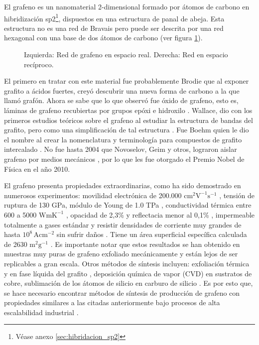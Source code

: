 
El grafeno es un nanomaterial 2-dimensional formado por átomos de carbono en hibridización sp2\footnote{Véase anexo  \ref{sec:hibridacion_sp2}}, dispuestos en una estructura de panal de abeja. Esta estructura no es una red de Bravais pero puede ser descrita por una red hexagonal con una base de dos átomos de carbono (ver figura \ref{fig_graphene_lattice}). 

\begin{figure}
	\centering
	\caption[Estructura cristalina del grafeno]{Izquierda: Red de grafeno en espacio real. Derecha: Red en espacio recíproco.}
	\label{fig_graphene_lattice}
\end{figure}

El primero en tratar con este material fue probablemente Brodie \citep{Brodie1859} que al exponer grafito a ácidos fuertes, creyó descubrir una nueva forma de carbono a la que llamó grafón. Ahora se sabe que lo que observó fue óxido de grafeno, esto es, láminas de grafeno recubiertas por grupos epóxi e hidroxilo \citep{Geim2012}. Wallace, dio con los primeros estudios teóricos sobre el grafeno al estudiar la estructura de bandas del grafito, pero como una simplificación de tal estructura \citep{Wallace1947}. Fue Boehm quien le dio el nombre al crear la nomenclatura y terminología para compuestos de grafito intercalado \citep{Boehm1986}. No fue hasta 2004 que Novoselov, Geim y otros, lograron aislar grafeno por medios mecánicos \citep{Novoselov2004}, por lo que les fue otorgado el Premio Nobel de Física en el año 2010.

El grafeno presenta propiedades extraordinarias, como ha sido demostrado en numerosos experimentos: movilidad electrónica de 200.000 $\mathrm{cm^2 V^{-1} s^{-1} }$ \citep{Bolotin2008}, tensión de ruptura de 130 GPa, módulo de Young de 1.0 TPa \citep{Lee2008}, conductividad térmica entre 600 a 5000 $\mathrm{W mK^{-1}}$ \citep{Balaanzandin2011}, opacidad de 2,3\% y reflectacia menor al 0,1\% \citep{Nair2008}, impermeable totalmente a gases estándar \citep{Bunch2008} y resistir densidades de corriente muy grandes de hasta $\mathrm{10^8\,A cm^{-2}}$ sin sufrir daños  \citep{Moser2007}. Tiene un área superficial específica calculada de 2630 $\mathrm{m^2 g^{-1}}$ \citep{Peigney2001}. Es importante notar que estos resultados se han obtenido en muestras muy puras de grafeno exfoliado mecánicamente \citep{Novoselov2004} y están lejos de ser replicables a gran escala. Otros métodos de síntesis incluyen: exfoliación térmica y en fase líquida del grafito \citep{Blake2008}, deposición química de vapor (CVD) en sustratos de cobre, sublimación de los átomos de silicio en carburo de silicio \citep{DeHeer2011a}. Es por esto que, se hace necesario encontrar métodos de síntesis de producción de grafeno con propiedades similares a las citadas anteriormente bajo procesos de alta escalabilidad industrial \citep{Novoselov2012}.

